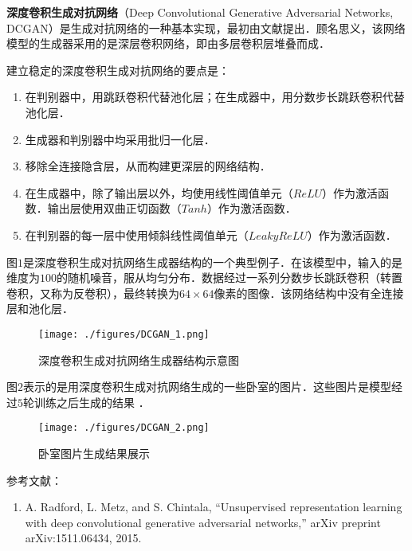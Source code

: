 
\textbf{深度卷积生成对抗网络}（Deep Convolutional Generative Adversarial Networks, DCGAN）是生成对抗网络的一种基本实现，最初由文献\cite{DCGAN}提出．顾名思义，该网络模型的生成器采用的是深层卷积网络，即由多层卷积层堆叠而成．

建立稳定的深度卷积生成对抗网络的要点是\cite{DCGAN}：
\begin{enumerate}
\item 在判别器中，用跳跃卷积代替池化层；在生成器中，用分数步长跳跃卷积代替池化层．
\item 生成器和判别器中均采用批归一化层．
\item 移除全连接隐含层，从而构建更深层的网络结构．
\item 在生成器中，除了输出层以外，均使用线性阈值单元（$ReLU$）作为激活函数．输出层使用双曲正切函数（$Tanh$）作为激活函数．
\item 在判别器的每一层中使用倾斜线性阈值单元（$Leaky ReLU$）作为激活函数．
\end{enumerate}

图$1$是深度卷积生成对抗网络生成器结构的一个典型例子．在该模型中，输入的是维度为$100$的随机噪音，服从均匀分布．数据经过一系列分数步长跳跃卷积（转置卷积，又称为反卷积），最终转换为$64 \times64$像素的图像．该网络结构中没有全连接层和池化层．
\begin{figure}[ht]
\centering
\texttt{[image: ./figures/DCGAN\_1.png]}
\caption{深度卷积生成对抗网络生成器结构示意图 \cite{DCGAN}} \label{DCGAN_fig1}
\end{figure}

图$2$表示的是用深度卷积生成对抗网络生成的一些卧室的图片．这些图片是模型经过$5$轮训练之后生成的结果 \cite{DCGAN}．
\begin{figure}[ht]
\centering
\texttt{[image: ./figures/DCGAN\_2.png]}
\caption{卧室图片生成结果展示} \label{DCGAN_fig2}
\end{figure}




参考文献：
\begin{enumerate}
\item A. Radford, L. Metz, and S. Chintala, “Unsupervised representation learning with deep convolutional generative adversarial networks,” arXiv preprint arXiv:1511.06434, 2015.
\end{enumerate}